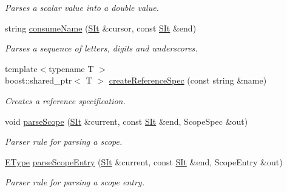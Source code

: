 \begin{DoxyCompactItemize}
\begin{DoxyCompactList}\small\item\em Parses a scalar value into a double value. \end{DoxyCompactList}\item 
string \hyperlink{classgiskard__suturo_1_1GiskardLangParser_a0d2f86c718b7354869cf228fa0cdcde0}{consume\-Name} (\hyperlink{classgiskard__suturo_1_1GiskardLangParser_aaebad1dc1afc92c7bdc1aa7e4d679621}{S\-It} \&cursor, const \hyperlink{classgiskard__suturo_1_1GiskardLangParser_aaebad1dc1afc92c7bdc1aa7e4d679621}{S\-It} \&end)
\begin{DoxyCompactList}\small\item\em Parses a sequence of letters, digits and underscores. \end{DoxyCompactList}\item 
{\footnotesize template$<$typename T $>$ }\\boost\-::shared\-\_\-ptr$<$ T $>$ \hyperlink{classgiskard__suturo_1_1GiskardLangParser_a57f1502792406199db508a6a20b28670}{create\-Reference\-Spec} (const string \&name)
\begin{DoxyCompactList}\small\item\em Creates a reference specification. \end{DoxyCompactList}\item 
void \hyperlink{classgiskard__suturo_1_1GiskardLangParser_a9df7e4b0cecd0ea3d892779e0d53412d}{parse\-Scope} (\hyperlink{classgiskard__suturo_1_1GiskardLangParser_aaebad1dc1afc92c7bdc1aa7e4d679621}{S\-It} \&current, const \hyperlink{classgiskard__suturo_1_1GiskardLangParser_aaebad1dc1afc92c7bdc1aa7e4d679621}{S\-It} \&end, Scope\-Spec \&out)
\begin{DoxyCompactList}\small\item\em Parser rule for parsing a scope. \end{DoxyCompactList}\item 
\hyperlink{classgiskard__suturo_1_1GiskardLangParser_adbdbadf4ee4e2afb358b4ff98bf7daa2}{E\-Type} \hyperlink{classgiskard__suturo_1_1GiskardLangParser_a5f7a727383f9e4020581e0fc20208a8a}{parse\-Scope\-Entry} (\hyperlink{classgiskard__suturo_1_1GiskardLangParser_aaebad1dc1afc92c7bdc1aa7e4d679621}{S\-It} \&current, const \hyperlink{classgiskard__suturo_1_1GiskardLangParser_aaebad1dc1afc92c7bdc1aa7e4d679621}{S\-It} \&end, Scope\-Entry \&out)
\begin{DoxyCompactList}\small\item\em Parser rule for parsing a scope entry. \end{DoxyCompactList}\item 

\end{DoxyCompactItemize}
